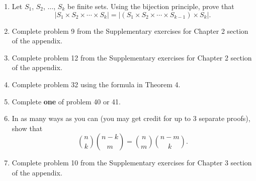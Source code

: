 \documentclass[12pt]{article}
\begin{document}
\begin{enumerate}
 \item Let $S_1$, $S_2$, $\ldots$, $S_k$ be finite sets. Using the bijection principle, prove that $$|S_1\times S_2\times\cdots \times S_k|=|(S_1\times S_2\times\cdots\times S_{k-1})\times S_{k}|.$$
\item Complete problem 9 from the Supplementary exercises for Chapter 2 section of the appendix.
\item Complete problem 12 from the Supplementary exercises for Chapter 2 section of the appendix. 

\item Complete problem 32 using the formula in Theorem 4. 
\item Complete {\bf one} of problem 40 or 41. 
\item In as many ways as you can (you may get credit for up to 3 separate proofs), show that $${n\choose k}{n-k\choose m}={n\choose m}{n-m\choose k}.$$
\item Complete problem 10 from the Supplementary exercises for Chapter 3 section of the appendix. 
\end{enumerate}
\end{document}
